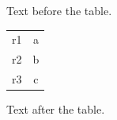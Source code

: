 \documentclass[12pt]{article}
\begin{document}
\setlength{\LTpre}{0pt}
\setlength{\LTpost}{30pt}
Text before the table.

\begin{longtable}{lc}
r1 & a\\
r2 & b\\
r3 & c\\
\end{longtable}

Text after the table.
\end{document}
